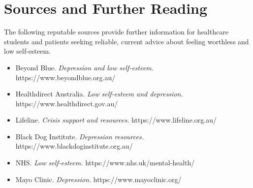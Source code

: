 \section*{Sources and Further Reading}
The following reputable sources provide further information for healthcare students and patients seeking reliable, current advice about feeling worthless and low self-esteem.
\begin{itemize}
    \item Beyond Blue. \textit{Depression and low self-esteem.} https://www.beyondblue.org.au/
    \item Healthdirect Australia. \textit{Low self-esteem and depression.} https://www.healthdirect.gov.au/
    \item Lifeline. \textit{Crisis support and resources.} https://www.lifeline.org.au/
    \item Black Dog Institute. \textit{Depression resources.} https://www.blackdoginstitute.org.au/
    \item NHS. \textit{Low self-esteem.} https://www.nhs.uk/mental-health/
    \item Mayo Clinic. \textit{Depression.} https://www.mayoclinic.org/
\end{itemize}
